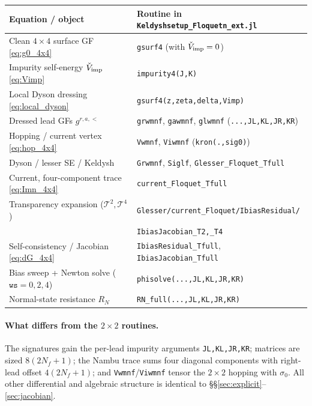 \documentclass[11pt,a4paper]{article}
\begin{document}
\begin{center}
\renewcommand{\arraystretch}{1.25}
\begin{tabular}{ll}
\hline
\textbf{Equation / object} & \textbf{Routine in \texttt{Keldyshsetup\_Floquetn\_ext.jl}}\\
\hline
Clean $4\times4$ surface GF \eqref{eq:g0_4x4} & \texttt{gsurf4} (with $\check V_{\rm imp}=0$)\\
Impurity self-energy $\check V_{\rm imp}$ \eqref{eq:Vimp} & \texttt{impurity4(J,K)}\\
Local Dyson dressing \eqref{eq:local_dyson} & \texttt{gsurf4(z,zeta,delta,Vimp)}\\
Dressed lead GFs $g^{r,a,<}$ & \texttt{grwmnf}, \texttt{gawmnf}, \texttt{glwmnf} (\texttt{...,JL,KL,JR,KR})\\
Hopping / current vertex \eqref{eq:hop_4x4} & \texttt{Vwmnf}, \texttt{Viwmnf} (\verb|kron(.,sig0)|)\\
Dyson / lesser SE / Keldysh & \texttt{Grwmnf}, \texttt{Siglf}, \texttt{Glesser\_Floquet\_Tfull}\\
Current, four-component trace \eqref{eq:Imn_4x4} & \texttt{current\_Floquet\_Tfull}\\
Transparency expansion ($\mathcal T^2,\mathcal T^4$) & \texttt{Glesser/current\_Floquet/IbiasResidual/}\\
                                                     & \texttt{IbiasJacobian\_T2,\_T4}\\
Self-consistency / Jacobian \eqref{eq:dG_4x4} & \texttt{IbiasResidual\_Tfull}, \texttt{IbiasJacobian\_Tfull}\\
Bias sweep + Newton solve ($\texttt{ws}=0,2,4$) & \texttt{phisolve(...,JL,KL,JR,KR)}\\
Normal-state resistance $R_N$ & \texttt{RN\_full(...,JL,KL,JR,KR)}\\
\hline
\end{tabular}
\end{center}

\paragraph{What differs from the $2\times2$ routines.}
The signatures gain the per-lead impurity arguments \texttt{JL,KL,JR,KR}; matrices
are sized $8(2N_f+1)$; the Nambu trace sums four diagonal components with
right-lead offset $4(2N_f+1)$; and \texttt{Vwmnf}/\texttt{Viwmnf} tensor the
$2\times2$ hopping with $\sigma_0$.  All other differential and algebraic
structure is identical to \S\S\ref{sec:explicit}--\ref{sec:jacobian}.
\end{document}
